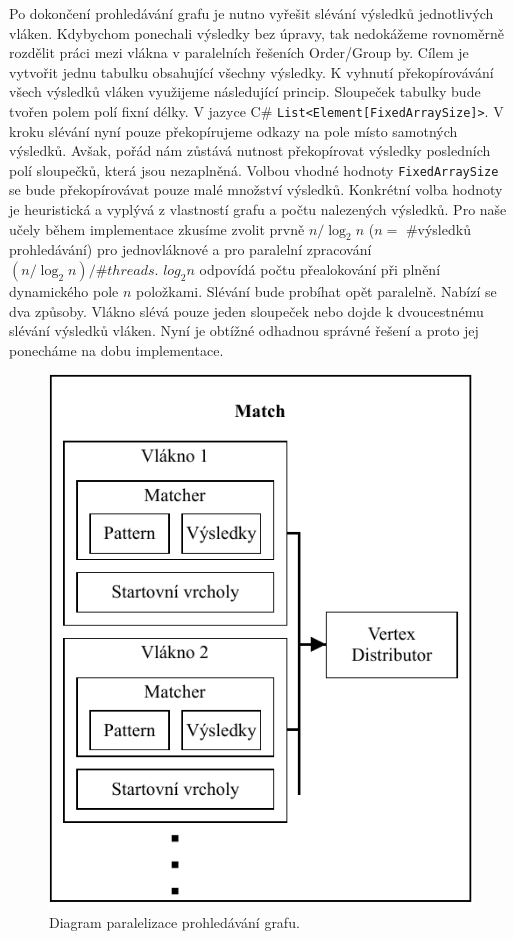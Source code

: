 Po dokončení prohledávání grafu je nutno vyřešit slévání výsledků jednotlivých vláken.
Kdybychom ponechali výsledky bez úpravy, tak nedokážeme rovnoměrně rozdělit práci mezi vlákna v paralelních řešeních Order/Group by.
Cílem je vytvořit jednu tabulku obsahující všechny výsledky.
K vyhnutí překopírovávání všech výsledků vláken využijeme následující princip.
Sloupeček tabulky bude tvořen polem polí fixní délky.
V jazyce C\# \texttt{List<Element[FixedArraySize]>}.
V kroku slévání nyní pouze překopírujeme odkazy na pole místo samotných výsledků.
Avšak, pořád nám zůstává nutnost překopírovat výsledky posledních polí sloupečků, která jsou nezaplněná.
Volbou vhodné hodnoty \texttt{FixedArraySize} se bude překopírovávat pouze malé množství výsledků.
Konkrétní volba hodnoty je heuristická a vyplývá z vlastností grafu a počtu nalezených výsledků.
Pro naše učely během implementace zkusíme zvolit prvně $n/\log_2 n$ ($n = $ \#výsledků prohledávání) pro jednovláknové a pro paralelní zpracování $(n/\log_2 n)/\#threads$.
$log_2 n$ odpovídá počtu přealokování při plnění dynamického pole $n$ položkami.
Slévání bude probíhat opět paralelně.
Nabízí se dva způsoby.
Vlákno slévá pouze jeden sloupeček nebo dojde k dvoucestnému slévání výsledků vláken.
Nyní je obtížné odhadnou správné řešení a proto jej ponecháme na dobu implementace.    

\clearpage

\begin{figure}[!htp]
\includegraphics{../img/diaQueryObjectsMatchPar.pdf}\centering
\caption{Diagram paralelizace prohledávání grafu.}
\label{figure.diaQueryObjectsMatchPar}
\end{figure}

